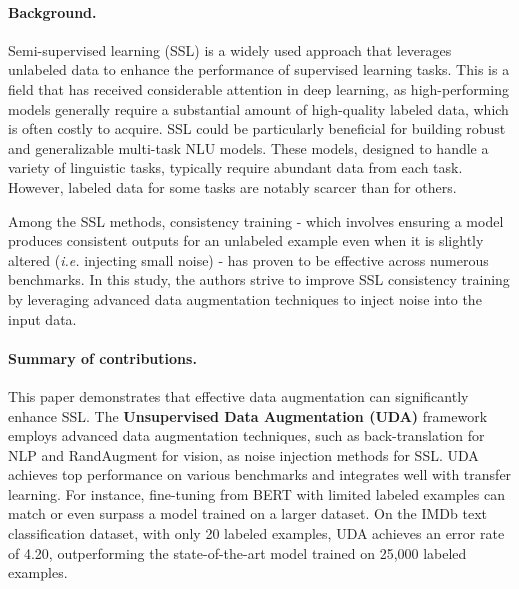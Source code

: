\documentclass{article}
\begin{document}
\paragraph{Background.}

Semi-supervised learning (SSL) is a widely used approach that leverages unlabeled data to 
enhance the performance of supervised learning tasks. 
This is a field that has received considerable attention in deep learning, 
as high-performing models generally require a substantial amount of high-quality labeled data, 
which is often costly to acquire.
SSL could be particularly beneficial for building robust and 
generalizable multi-task NLU models. These models, designed to handle a variety of 
linguistic tasks, typically require abundant data from each task. However, labeled data 
for some tasks are notably scarcer than for others.

Among the SSL methods, consistency training - which involves ensuring a model produces 
consistent outputs for an unlabeled example even when it is slightly altered 
(\textit{i.e.} injecting small noise) - has proven to be effective across numerous benchmarks.
In this study, the authors strive to improve SSL consistency training by leveraging advanced
data augmentation techniques to inject noise into the input data.

\paragraph{Summary of contributions.}
This paper demonstrates that effective data augmentation can significantly enhance 
SSL. The \textbf{Unsupervised Data Augmentation (UDA)} framework employs advanced data 
augmentation techniques, such as back-translation for NLP and RandAugment for vision, 
as noise injection methods for SSL. UDA achieves top performance on 
various benchmarks and integrates well with transfer learning. For instance, 
fine-tuning from BERT with limited labeled examples can match or even surpass a model 
trained on a larger dataset. On the IMDb text classification dataset, with only 20 
labeled examples, UDA achieves an error rate of 4.20, outperforming the state-of-the-art 
model trained on 25,000 labeled examples.
\end{document}
